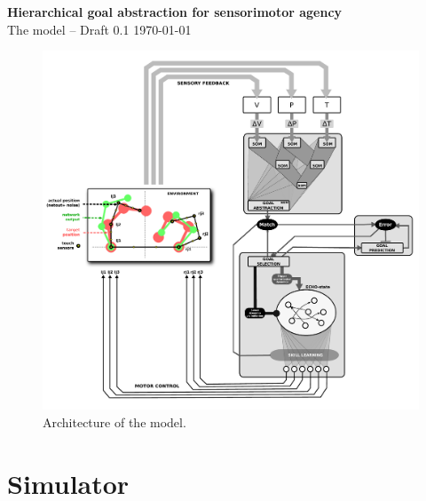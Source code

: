\documentclass[11pt]{article}
\begin{document}
\begin{center} \huge{\bfseries{Hierarchical goal abstraction for sensorimotor
    agency}}\\ {The model -- Draft 0.1 \today}\\[3cm] \end{center}


\begin{figure}[H] \centering \includegraphics[width=.8\textwidth]{schema}
    \caption{Architecture of the model.} \label{fig:blueprint} \end{figure}

\section{Simulator}
\end{document}
